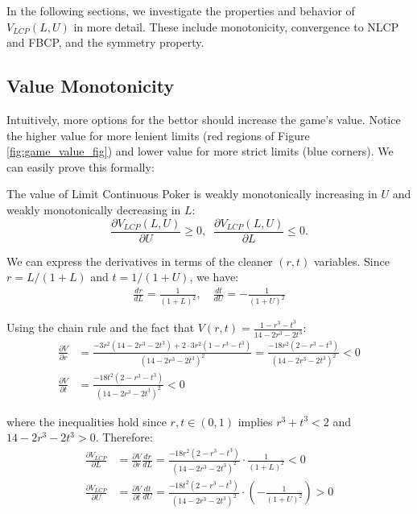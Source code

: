 \documentclass[../../main/main.tex]{subfiles}
\begin{document}
In the following sections, we investigate the properties and behavior of $V_{LCP}(L, U)$ in more detail. These include monotonicity, convergence to NLCP and FBCP, and the symmetry property.


\subsection{Value Monotonicity}

Intuitively, more options for the bettor should increase the game's value. Notice the higher value for more lenient limits (red regions of Figure \ref{fig:game_value_fig}) and lower value for more strict limits (blue corners). We can easily prove this formally:

\begin{theorem}
    The value of Limit Continuous Poker is weakly monotonically increasing in $U$ and weakly monotonically decreasing in $L$:
\[
    \frac{\partial V_{LCP}(L, U)}{\partial U} \geq 0, \;\; \frac{\partial V_{LCP}(L, U)}{\partial L} \leq 0.
\]
\end{theorem}
\begin{customproof}
    We can express the derivatives in terms of the cleaner $(r,t)$ variables. Since $r = L/(1+L)$ and $t = 1/(1+U)$, we have:
    \begin{align*}
        \frac{dr}{dL} = \frac{1}{(1+L)^2}, \quad \frac{dt}{dU} = -\frac{1}{(1+U)^2}
    \end{align*}

    Using the chain rule and the fact that $V(r,t) = \frac{1-r^3-t^3}{14-2r^3-2t^3}$:
    \begin{align*}
        \frac{\partial V}{\partial r} &= \frac{-3r^2(14-2r^3-2t^3) + 2 \cdot 3r^2(1-r^3-t^3)}{(14-2r^3-2t^3)^2} = \frac{-18r^2(2-r^3-t^3)}{(14-2r^3-2t^3)^2} < 0\\
        \frac{\partial V}{\partial t} &= \frac{-18t^2(2-r^3-t^3)}{(14-2r^3-2t^3)^2} < 0
    \end{align*}

    where the inequalities hold since $r, t \in (0,1)$ implies $r^3 + t^3 < 2$ and $14 - 2r^3 - 2t^3 > 0$. Therefore:
    \begin{align*}
        \frac{\partial V_{LCP}}{\partial L} &= \frac{\partial V}{\partial r} \frac{dr}{dL} = \frac{-18r^2(2-r^3-t^3)}{(14-2r^3-2t^3)^2} \cdot \frac{1}{(1+L)^2} < 0 \\
        \frac{\partial V_{LCP}}{\partial U} &= \frac{\partial V}{\partial t} \frac{dt}{dU} = \frac{-18t^2(2-r^3-t^3)}{(14-2r^3-2t^3)^2} \cdot \left(-\frac{1}{(1+U)^2}\right) > 0
    \end{align*}
\end{customproof}
\end{document}
